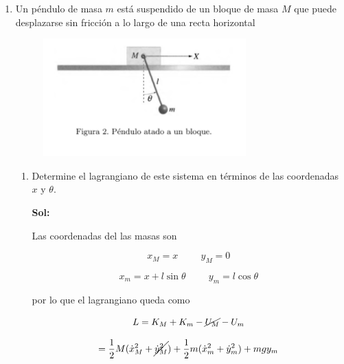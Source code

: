 \documentclass[12pt,a4paper]{article}
\begin{document}
\begin{enumerate}
\begin{enumerate}
\end{enumerate}







\item Un péndulo de masa $m$ está suspendido de un bloque de masa $M$ que puede desplazarse sin fricción a lo largo de una recta horizontal

\begin{figure}[h!]
    \centering
    \includegraphics{2.PNG}
\end{figure}

\begin{enumerate}
    \item Determine el lagrangiano de este sistema en términos de las coordenadas $x$ y $\theta$.
    
    \textbf{Sol:}
    
    Las coordenadas del las masas son
    
    \begin{equation*}
        x_M = x \hspace{1cm} y_M = 0
    \end{equation*}
    
    \begin{equation*}
        x_m = x + l \sin{\theta} \hspace{1cm} y_{m} = l \cos{\theta}
    \end{equation*}
    
    por lo que el lagrangiano queda como
    
    \begin{equation*}
        L = K_M + K_m - \cancel{U_M} - U_m
    \end{equation*}
    
    \begin{equation*}
        = \frac{1}{2}M (\dot{x}_{M}^{2} + \cancel{\dot{y}_{M}^2}) + \frac{1}{2} m (\dot{x}_{m}^{2} + \dot{y}_{m}^{2}) + mgy_m
    \end{equation*}
    

\end{enumerate}
\end{enumerate}
\end{document}
